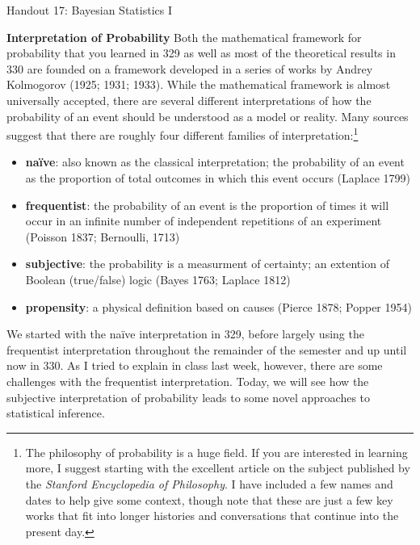 \documentclass{tufte-handout}
\begin{document}
\justify

{\LARGE Handout 17: Bayesian Statistics I}

\vspace*{18pt}

\noindent
\textbf{Interpretation of Probability}
Both the mathematical framework for probability that you learned in
329 as well as most of the theoretical results in 330 are founded on
a framework developed in a series of works by Andrey Kolmogorov
(1925; 1931; 1933). While the mathematical framework is almost 
universally accepted, there are several different interpretations
of how the probability of an event should be understood as a model
or reality. Many sources suggest that there are roughly four different
families of interpretation:\footnote{
  The philosophy of probability is a huge field. If you are interested
  in learning more, I suggest starting with the excellent article on the
  subject published by the \textit{Stanford Encyclopedia of Philosophy}.
  I have included a few names and dates to help give some 
  context, though note that these are just a few key works that fit into
  longer histories and conversations that continue into the present day.
}
\begin{itemize}
  \setlength\itemsep{0em}
\item \textbf{na\"{i}ve}: also known as the classical interpretation;
the probability of an event as the proportion of total outcomes in which
this event occurs (Laplace 1799)
\item \textbf{frequentist}: the probability of an event is the proportion
of times it will occur in an infinite number of independent repetitions
of an experiment (Poisson 1837; Bernoulli, 1713)
\item \textbf{subjective}: the probability is a measurment of certainty;
an extention of Boolean (true/false) logic (Bayes 1763; Laplace 1812)
\item \textbf{propensity}: a physical definition based on causes
(Pierce 1878; Popper 1954)
\end{itemize}
We started with the na\"{i}ve interpretation in 329, before largely
using the frequentist interpretation throughout the remainder of the
semester and up until now in 330. As I tried to explain in class last
week, however, there are some challenges with the frequentist
interpretation. Today, we will see how the subjective interpretation
of probability leads to some novel approaches to statistical inference.

\vspace*{12pt}
\end{document}
